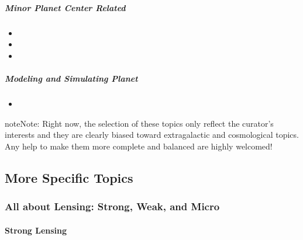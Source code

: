 \documentclass[letterpaper,10pt,english]{sphinxmanual}
\begin{document}
\subparagraph{Minor Planet Center Related}
\label{\detokenize{resource/astro/topics/solar_system:minor-planet-center-related}}\begin{itemize}
\item {} 

\item {} 

\item {} 

\end{itemize}


\subparagraph{Modeling and Simulating Planet}
\label{\detokenize{resource/astro/topics/solar_system:modeling-and-simulating-planet}}\begin{itemize}
\item {} 

\end{itemize}

\begin{sphinxadmonition}{note}{Note:}
Right now, the selection of these topics only reflect the curator’s interests and they are
clearly biased toward extragalactic and cosmological topics.
Any help to make them more complete and balanced are highly welcomed!
\end{sphinxadmonition}


\subsection{More Specific Topics}
\label{\detokenize{astro_topic:more-specific-topics}}

\subsubsection{All about Lensing: Strong, Weak, and Micro}
\label{\detokenize{resource/astro/topics/lensing:all-about-lensing-strong-weak-and-micro}}\label{\detokenize{resource/astro/topics/lensing::doc}}

\paragraph{Strong Lensing}
\label{\detokenize{resource/astro/topics/lensing:strong-lensing}}
\end{document}
